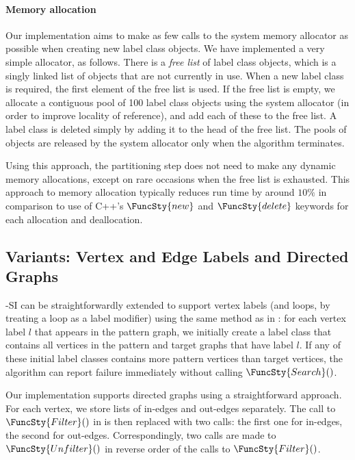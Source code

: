 \paragraph{Memory allocation}
Our implementation aims to make as few calls to the system memory allocator as possible when creating
new label class objects.  We have implemented a very simple allocator, as follows.  There is a \emph{free list}
of label class objects, which is a singly linked list of objects that are not currently in use.  When
a new label class is required, the first element of the free list is used.  If the free list is empty,
we allocate a contiguous pool of 100 label class objects using the system allocator (in order to improve
locality of reference), and add each of these to the free list.  A label class is deleted simply by
adding it to the head of the free list.  The pools of objects are released by the system allocator only when
the algorithm terminates.

Using this approach, the partitioning step does not need to make any dynamic memory allocations, except
on rare occasions when the free list is exhausted.
This approach to memory allocation typically reduces run time by around $10\%$ in comparison to use of
C++'s $\FuncSty{new}$ and $\FuncSty{delete}$ keywords for each allocation and deallocation.

\subsection{Variants: Vertex and Edge Labels and Directed Graphs}

\McSplit-SI can be straightforwardly extended to support vertex labels (and loops, by
treating a loop as a label modifier) using
the same method as in \McSplit: for each vertex label $l$ that appears in the pattern graph,
we initially create a label class that contains all vertices in the pattern and target
graphs that have label $l$.  If any of these initial label classes contains more pattern vertices
than target vertices, the algorithm can report failure immediately without calling
$\FuncSty{Search}()$.

Our implementation supports directed graphs using a straightforward approach.  For each
vertex, we store lists of in-edges and out-edges separately.  The call to $\FuncSty{Filter}()$
in  is then replaced with two calls: the first one for in-edges, the second
for out-edges.  Correspondingly, two calls are made to $\FuncSty{Unfilter}()$ in reverse
order of the calls to $\FuncSty{Filter}()$.

